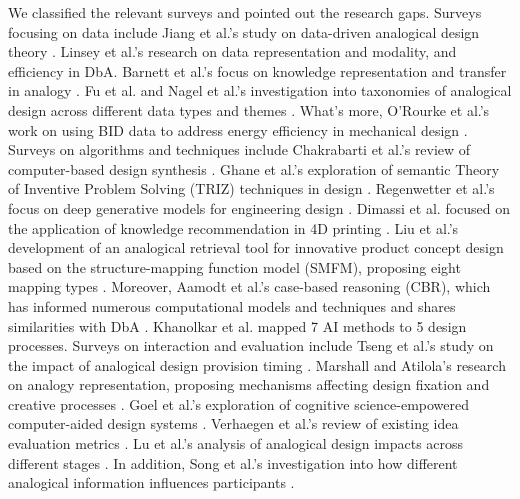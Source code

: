 We classified the relevant surveys and pointed out the research gaps. Surveys focusing on data include Jiang et al.'s study on data-driven analogical design theory \cite{jiang2022data}. Linsey et al.'s research on data representation and modality\cite{linsey2008modality}, and efficiency in DbA\cite{linsey2010study}. Barnett et al.'s focus on knowledge representation and transfer in analogy \cite{barnett2002and}. Fu et al. and Nagel et al.'s investigation into taxonomies of analogical design across different data types and themes \cite{fu2014bio, nagel2018establishing}. What’s more, O'Rourke et al.'s work on using BID data to address energy efficiency in mechanical design \cite{o2015toward}.
Surveys on algorithms and techniques include Chakrabarti et al.'s review of computer-based design synthesis \cite{chakrabarti2011computer}. Ghane et al.'s exploration of semantic Theory of Inventive Problem Solving (TRIZ) techniques in design \cite{ghane2024semantic}. Regenwetter et al.'s focus on deep generative models for engineering design \cite{regenwetter2022deep}. Dimassi et al. focused on the application of knowledge recommendation in 4D printing \cite{dimassi2023knowledge}. Liu et al.'s development of an analogical retrieval tool for innovative product concept design based on the structure-mapping function model (SMFM), proposing eight mapping types \cite{liu2023smfm}. Moreover, Aamodt et al.'s case-based reasoning (CBR), which has informed numerous computational models and techniques and shares similarities with DbA \cite{aamodt1994case}. Khanolkar et al.\cite{khanolkar2023mapping} mapped 7 AI methods to 5 design processes.
Surveys on interaction and evaluation include Tseng et al.'s study on the impact of analogical design provision timing \cite{tseng2008role}. Marshall and Atilola's research on analogy representation, proposing mechanisms affecting design fixation and creative processes \cite{atilola2015representing, marshall2016analogy}. Goel et al.'s exploration of cognitive science-empowered computer-aided design systems \cite{goel2012cognitive}. Verhaegen et al.'s review of existing idea evaluation metrics \cite{verhaegen2013refinements}. Lu et al.'s analysis of analogical design impacts across different stages \cite{lu2023differences}. In addition, Song et al.'s investigation into how different analogical information influences participants \cite{song2018characterizing}.
